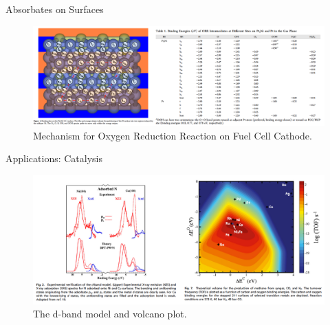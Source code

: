 \documentclass[aspectratio=169]{beamer}
\begin{document}
\begin{frame}{Absorbates on Surfaces}
\begin{figure}
    \centering
    \includegraphics[width=\linewidth]{lectures/figures/11_binding.png}
    \caption{Mechanism for Oxygen Reduction Reaction on  Fuel Cell Cathode.\cite{shaMechanismOxygenReduction2012}}
\end{figure} 
\end{frame} 


\begin{frame}{Applications: Catalysis}
\begin{figure}
    \centering
    \includegraphics[width=\linewidth]{lectures/figures/11_catalysis.png}
    \caption{The d-band model and volcano plot.\cite{norskovSurfaceChemistrySpecial2011}}
\end{figure} 
\end{frame} 
\end{document}
